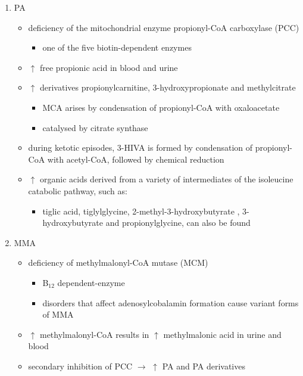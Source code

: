 \documentclass{scrartcl}
\begin{document}
\begin{enumerate}
\item PA
\label{sec:orgc7a4a85}
\begin{itemize}
\item deficiency of the mitochondrial enzyme propionyl-CoA carboxylase (PCC)
\begin{itemize}
\item one of the five biotin-dependent enzymes
\end{itemize}
\item \(\uparrow\) free propionic acid in blood and urine
\item \(\uparrow\) derivatives propionylcarnitine, 3-hydroxypropionate and methylcitrate
\begin{itemize}
\item MCA arises by condensation of propionyl-CoA with oxaloacetate
\item catalysed by citrate synthase
\end{itemize}
\item during ketotic episodes, 3-HIVA is formed by condensation of
propionyl-CoA with acetyl-CoA, followed by chemical reduction
\item \(\uparrow\) organic acids derived from a variety of intermediates of
the isoleucine catabolic pathway, such as:
\begin{itemize}
\item tiglic acid, tiglylglycine, 2-methyl-3-hydroxybutyrate ,
3-hydroxybutyrate and propionylglycine, can also be found
\end{itemize}
\end{itemize}

\item MMA
\label{sec:orgdb0d41e}
\begin{itemize}
\item deficiency of methylmalonyl-CoA mutase (MCM)
\begin{itemize}
\item B\(_{\text{12}}\) dependent-enzyme
\item disorders that affect adenosylcobalamin formation cause variant
forms of MMA
\end{itemize}
\item \(\uparrow\) methylmalonyl-CoA results in \(\uparrow\) methylmalonic acid
in urine and blood
\item secondary inhibition of PCC \(\to\) \(\uparrow\) PA and PA derivatives
\end{itemize}


\end{enumerate}
\end{document}
